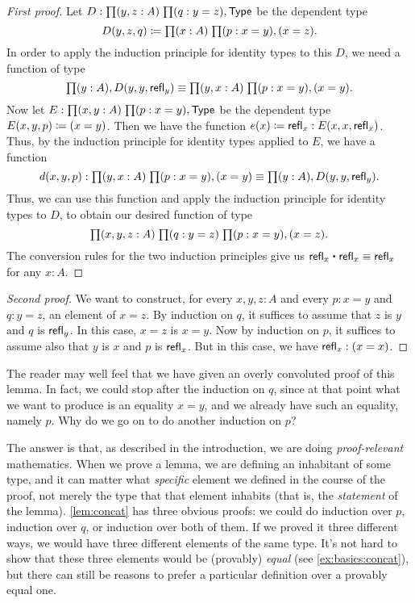 \begin{proof}[First proof]
  Let $D:\prd{y,z:A}{q:y=z} \type$ be the dependent type
  \begin{equation*}
    D(y,z,q)\defeq \prd{x:A}{p:x=y} (x=z).
  \end{equation*}
  In order to apply the induction principle for identity types to this $D$, we need a function of type
  \begin{equation*}
    \prd{y:A} D(y,y,\refl{y})
    \jdeq \prd{y,x:A}{p:x=y} (x=y).
  \end{equation*}
  Now let $E:\prd{x,y:A}{p:x=y}\type$ be the dependent type $E(x,y,p)\coloneqq (x=y)$.
  Then we have the function $e(x) \coloneqq \mathsf{refl}_{x} : E(x,x,\mathsf{refl}_{x})$.
  Thus, by the induction principle for identity types applied to $E$, we have a function
  \begin{equation*}
    d(x,y,p) : \prd{y,x:A}{p:x=y} (x=y) \jdeq \prd{y:A} D(y,y,\refl{y}).
  \end{equation*}
  Thus, we can use this function and apply the induction principle for identity types to $D$, to obtain our desired function of type
  \begin{equation*}
    \prd{x,y,z:A}{q:y=z}{p:x=y} (x=z).
  \end{equation*}
  The conversion rules for the two induction principles give us $\refl{x}\ct \refl{x}\jdeq \refl{x}$ for any $x:A$.
\end{proof}

\begin{proof}[Second proof]
  We want to construct, for every $x,y,z:A$ and every $p:x=y$ and $q:y=z$, an element of $x=z$.
  By induction on $q$, it suffices to assume that $z$ is $y$ and $q$ is $\mathsf{refl}_{y}$.
  In this case, $x=z$ is $x=y$.
  Now by induction on $p$, it suffices to assume also that $y$ is $x$ and $p$ is $\mathsf{refl}_{x}$.
  But in this case, we have $\mathsf{refl}_{x}:(x=x)$.
\end{proof}

The reader may well feel that we have given an overly convoluted proof of this lemma.
In fact, we could stop after the induction on $q$, since at that point what we want to produce is an equality $x=y$, and we already have such an equality, namely $p$.
Why do we go on to do another induction on $p$?

The answer is that, as described in the introduction, we are doing \emph{proof-relevant} mathematics.
When we prove a lemma, we are defining an inhabitant of some type, and it can matter what \emph{specific} element we defined in the course of the proof, not merely the type that that element inhabits (that is, the \emph{statement} of the lemma).
\autoref{lem:concat} has three obvious proofs: we could do induction over $p$, induction over $q$, or induction over both of them.
If we proved it three different ways, we would have three different elements of the same type.
It's not hard to show that these three elements would be (provably) \emph{equal} (see \autoref{ex:basics:concat}), but there can still be reasons to prefer a particular definition over a provably equal one.

